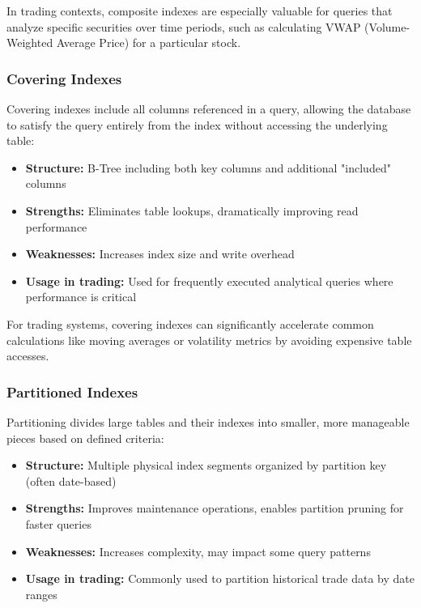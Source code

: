 \documentclass[11pt,a4paper]{article}
\begin{document}
In trading contexts, composite indexes are especially valuable for queries that analyze specific securities over time periods, such as calculating VWAP (Volume-Weighted Average Price) for a particular stock.

\subsubsection{Covering Indexes}

Covering indexes include all columns referenced in a query, allowing the database to satisfy the query entirely from the index without accessing the underlying table:

\begin{itemize}
    \item \textbf{Structure:} B-Tree including both key columns and additional "included" columns
    \item \textbf{Strengths:} Eliminates table lookups, dramatically improving read performance
    \item \textbf{Weaknesses:} Increases index size and write overhead
    \item \textbf{Usage in trading:} Used for frequently executed analytical queries where performance is critical
\end{itemize}

For trading systems, covering indexes can significantly accelerate common calculations like moving averages or volatility metrics by avoiding expensive table accesses.

\subsubsection{Partitioned Indexes}

Partitioning divides large tables and their indexes into smaller, more manageable pieces based on defined criteria:

\begin{itemize}
    \item \textbf{Structure:} Multiple physical index segments organized by partition key (often date-based)
    \item \textbf{Strengths:} Improves maintenance operations, enables partition pruning for faster queries
    \item \textbf{Weaknesses:} Increases complexity, may impact some query patterns
    \item \textbf{Usage in trading:} Commonly used to partition historical trade data by date ranges
\end{itemize}
\end{document}
